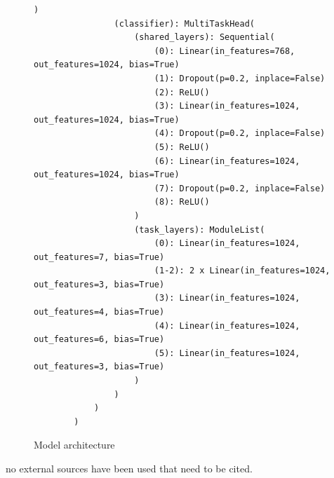 \documentclass{article}
\begin{document}
\begin{figure}[H]
\begin{minipage}[b]{\textwidth}
\begin{lstlisting}[caption={model architecture}, label={lst:appendix_code}, basicstyle=\small\small\ttfamily]
                )
                (classifier): MultiTaskHead(
                    (shared_layers): Sequential(
                        (0): Linear(in_features=768, out_features=1024, bias=True)
                        (1): Dropout(p=0.2, inplace=False)
                        (2): ReLU()
                        (3): Linear(in_features=1024, out_features=1024, bias=True)
                        (4): Dropout(p=0.2, inplace=False)
                        (5): ReLU()
                        (6): Linear(in_features=1024, out_features=1024, bias=True)
                        (7): Dropout(p=0.2, inplace=False)
                        (8): ReLU()
                    )
                    (task_layers): ModuleList(
                        (0): Linear(in_features=1024, out_features=7, bias=True)
                        (1-2): 2 x Linear(in_features=1024, out_features=3, bias=True)
                        (3): Linear(in_features=1024, out_features=4, bias=True)
                        (4): Linear(in_features=1024, out_features=6, bias=True)
                        (5): Linear(in_features=1024, out_features=3, bias=True)
                    )
                )
            )
        )
        \end{lstlisting}
    \end{minipage}
    \caption{Model architecture}
    \label{app:model}
\end{figure}




no external sources have been used that need to be cited. 
\end{document}
